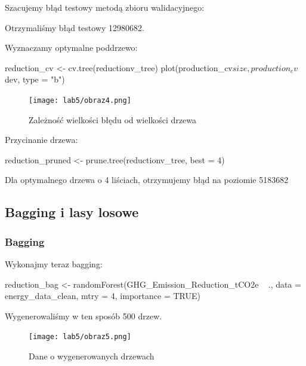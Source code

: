 Szacujemy błąd testowy metodą zbioru walidacyjnego:


Otrzymaliśmy błąd testowy 12980682.

Wyznaczamy optymalne poddrzewo:
\begin{Rcode}
reduction_cv <- cv.tree(reductionv_tree)
plot(production_cv$size, production_cv$dev, type = "b")
\end{Rcode}

\begin{figure}[H]
    \centering
    \texttt{[image: lab5/obraz4.png]}
    \caption{Zależność wielkości błędu od wielkości drzewa}
    \label{fig:enter-label}
\end{figure}

Przycinanie drzewa:
\begin{Rcode}
reduction_pruned <- prune.tree(reductionv_tree, best = 4)
\end{Rcode}

Dla optymalnego drzewa o 4 liściach, otrzymujemy błąd na poziomie 5183682

\subsection{Bagging i lasy losowe}
\subsubsection{Bagging}
Wykonajmy teraz bagging:

\begin{Rcode}
reduction_bag <- randomForest(GHG_Emission_Reduction_tCO2e ~ ., data = energy_data_clean, mtry = 4, importance = TRUE)
\end{Rcode}

Wygenerowaliśmy w ten sposób 500 drzew.

\begin{figure}[H]
    \centering
    \texttt{[image: lab5/obraz5.png]}
    \caption{Dane o wygenerowanych drzewach}
    \label{fig:enter-label}
\end{figure}

